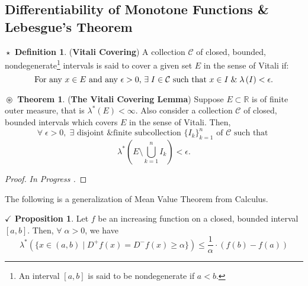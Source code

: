 \documentclass{article}
\theoremstyle{definition}
\newtheorem{definition}{$\boxed{\star}$ Definition}
\newtheorem{theorem}{$\boxed{\boxed{\circledast}}$ Theorem}
\theoremstyle{remark}
\theoremstyle{definition}
\theoremstyle{definition}
\newtheorem{proposition}{$\checkmark$ Proposition}
\theoremstyle{definition}
\newcommand{\bunion}{\bigcup}
\newcommand{\where}{\;\vert\;}
\newcommand{\R}{\mathbb{R}}
\newcommand{\lom}[1]{\lambda^*\left (#1\right )}
\newcommand{\lm}[1]{\lambda\left (#1\right )}
\begin{document}
\subsection{Differentiability of Monotone Functions \& Lebesgue's Theorem}
\begin{definition}
	(\textbf{Vitali Covering}) A collection $ \mathcal{C} $ of closed, bounded, nondegenerate\footnote{An interval $ [a,b] $ is said to be nondegenerate if $ a< b $.} intervals is said to cover a given set $ E $ in the sense of Vitali if:
	\[\text{For any $ x\in E $ and any $ \epsilon > 0 $, $ \exists \; I \in \mathcal{C}$ such that $x\in I \;\&\; \lm{I} < \epsilon $.}\]
\end{definition}
\hrulefill
\begin{theorem}\label{T-14}
	(\textbf{The Vitali Covering Lemma}) Suppose $ E \subset \R$ is of finite outer measure, that is $ \lom{E} < \infty $. Also consider a collection $ \mathcal{C} $ of closed, bounded intervals which covers $ E $ in the sense of Vitali. Then,
	\[\forall \;\epsilon > 0,\; \exists \text{ disjoint \& finite subcollection } \{I_k\}_{k=1}^{n} \text{ of } \mathcal{C} \text{ such that }\]
	\[\lom{E\setminus \bunion_{k=1}^{n} I_k } < \epsilon.\]
\end{theorem}
\begin{proof}
	\emph{In Progress \HalfFilledHut.}
\end{proof}
\newpage
The following is a generalization of Mean Value Theorem from Calculus.
\begin{proposition}
	Let $ f $ be an increasing function on a closed, bounded interval $ [a,b] $. Then, $ \forall \; \alpha > 0$, we have
	\[\lom{\{x\in(a,b)\where D^{+}f(x) = D^{-}f(x) \ge \alpha\}} \le\frac{1}{\alpha}\cdot \left ( f(b) - f(a) \right )\]
\end{proposition}
\end{document}
